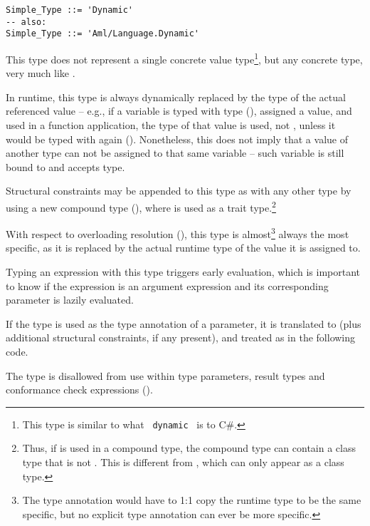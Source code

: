 \grammar\begin{lstlisting}[morekeywords={Dynamic},deletekeywords={also}]
Simple_Type ::= 'Dynamic'
-- also:
Simple_Type ::= 'Aml/Language.Dynamic'
\end{lstlisting}

This type does not represent a single concrete value type\footnote{This type is similar to what ~\lstinline[language={[Sharp]C}]!dynamic!~ is to C\#.}, but any concrete type, very much like . 

In runtime, this type is always dynamically replaced by the type of the actual referenced value -- e.g., if a variable is typed with  type (), assigned a value, and used in a function application, the type of that value is used, not , unless it would be typed with  again (). Nonetheless, this does not imply that a value of another type can not be assigned to that same variable -- such variable is still bound to  and accepts  type. 

Structural constraints may be appended to this type as with any other type by using a new compound type (), where  is used as a trait type.\footnote{Thus, if  is used in a compound type, the compound type can contain a class type that is not . This is different from , which can only appear as a class type.}

With respect to overloading resolution (), this type is almost\footnote{The type annotation would have to 1:1 copy the runtime type to be the same specific, but no explicit type annotation can ever be more specific.} always the most specific, as it is replaced by the actual runtime type of the value it is assigned to. 

Typing an expression with this type triggers early evaluation, which is important to know if the expression is an argument expression and its corresponding parameter is lazily evaluated. 

If the  type is used as the type annotation of a parameter, it is translated to  (plus additional structural constraints, if any present), and treated as  in the following code.

The  type is disallowed from use within type parameters, result types and conformance check expressions (). 

